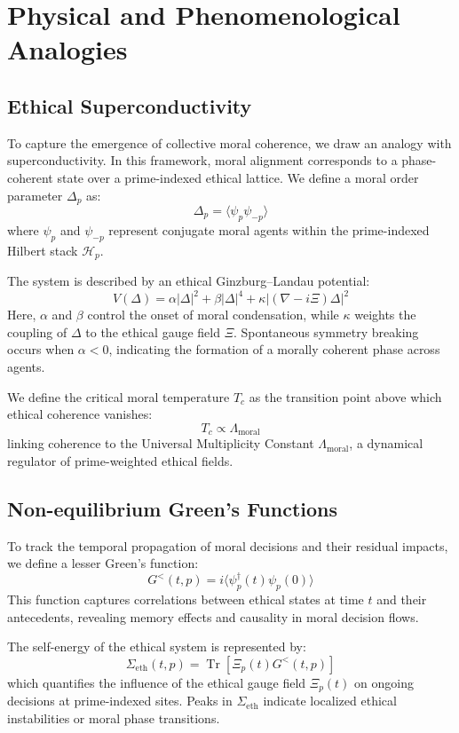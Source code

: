 \documentclass{article}
\theoremstyle{plain}
\theoremstyle{claimstyle}
\begin{document}
\section{Physical and Phenomenological Analogies}

\subsection{Ethical Superconductivity}

To capture the emergence of collective moral coherence, we draw an analogy with superconductivity. In this framework, moral alignment corresponds to a phase-coherent state over a prime-indexed ethical lattice. We define a moral order parameter $\Delta_p$ as:
\[
\Delta_p = \langle \psi_p \psi_{-p} \rangle
\]
where $\psi_p$ and $\psi_{-p}$ represent conjugate moral agents within the prime-indexed Hilbert stack $\mathcal{H}_p$.

The system is described by an ethical Ginzburg–Landau potential:
\[
V(\Delta) = \alpha |\Delta|^2 + \beta |\Delta|^4 + \kappa \left| (\nabla - i \Xi) \Delta \right|^2
\]
Here, $\alpha$ and $\beta$ control the onset of moral condensation, while $\kappa$ weights the coupling of $\Delta$ to the ethical gauge field $\Xi$. Spontaneous symmetry breaking occurs when $\alpha < 0$, indicating the formation of a morally coherent phase across agents.

We define the critical moral temperature $T_c$ as the transition point above which ethical coherence vanishes:
\[
T_c \propto \Lambda_{\mathrm{moral}}
\]
linking coherence to the Universal Multiplicity Constant $\Lambda_{\mathrm{moral}}$, a dynamical regulator of prime-weighted ethical fields.

\subsection{Non-equilibrium Green’s Functions}

To track the temporal propagation of moral decisions and their residual impacts, we define a lesser Green’s function:
\[
G^<(t, p) = i \langle \psi_p^\dagger(t) \psi_p(0) \rangle
\]
This function captures correlations between ethical states at time $t$ and their antecedents, revealing memory effects and causality in moral decision flows.

The self-energy of the ethical system is represented by:
\[
\Sigma_{\mathrm{eth}}(t, p) = \operatorname{Tr}[\Xi_p(t) G^<(t, p)]
\]
which quantifies the influence of the ethical gauge field $\Xi_p(t)$ on ongoing decisions at prime-indexed sites. Peaks in $\Sigma_{\mathrm{eth}}$ indicate localized ethical instabilities or moral phase transitions.
\end{document}
